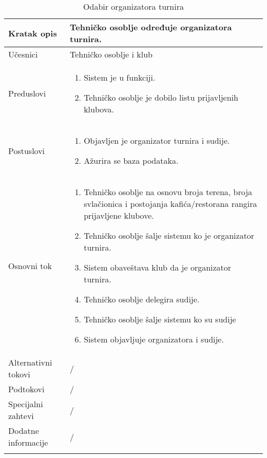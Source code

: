 \documentclass{article}
\begin{document}
    \begin{longtable}{| p{} | p{} |} 
        \hline
            Kratak opis & Tehničko osoblje određuje organizatora turnira.\\ 
        \hline    
            U\v{c}esnici & Tehničko osoblje i klub\\
        \hline
            Preduslovi & 
                \begin{enumerate}
                    \item Sistem je u funkciji.
                    \item Tehničko osoblje je dobilo listu prijavljenih klubova.
                \end{enumerate}\\
        \hline  
            Postuslovi & 
                \begin{enumerate}
                    \item Objavljen je organizator turnira i sudije.
                    \item Ažurira se baza podataka.
                \end{enumerate}\\
        \hline
            Osnovni tok & 
                \begin{enumerate}
                    \item Tehničko osoblje na osnovu broja terena, broja svlačionica i postojanja kafića/restorana rangira prijavljene klubove.
                    \item Tehničko osoblje šalje sistemu ko je organizator turnira.
                    \item Sistem obaveštava klub da je organizator turnira.
                    \item Tehničko osoblje delegira sudije.
                    \item Tehničko osoblje šalje sistemu ko su sudije
                    \item Sistem objavljuje organizatora i sudije.
                \end{enumerate}\\
        \hline
            Alternativni tokovi & /\\
        \hline
            Podtokovi & /\\
        \hline
            Specijalni zahtevi & /\\
        \hline
            Dodatne informacije & /\\
        \hline    
        \caption{Odabir organizatora turnira}
    \end{longtable}
\end{document}
